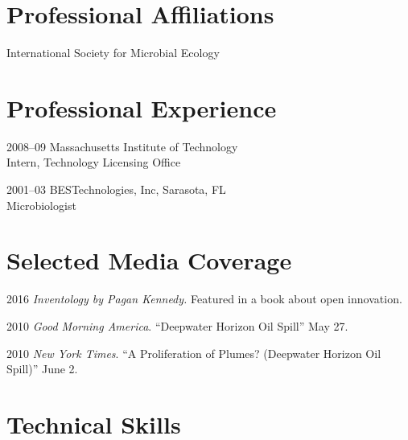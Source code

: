 \documentclass[12pt,letterpaper]{report}
\newcommand{\listitemspace}{0.15em}
\renewenvironment{itemize}
{\begin{list}{}{\setlength{\leftmargin}{0em}
            \setlength{\parskip}{0em}
            \setlength{\itemsep}{\listitemspace}
            \setlength{\parsep}{\listitemspace}}}
    {\end{list}}
\begin{document}
    \section*{Professional Affiliations}

    \begin{itemize}

        \item International Society for Microbial Ecology

    \end{itemize}



    \section*{Professional Experience}

    \begin{tablist}

        \item[2008--09] \tab Massachusetts Institute of Technology \\
        			    Intern, Technology Licensing Office
			    
	\item[2001--03] \tab BESTechnologies, Inc, Sarasota, FL \\
				Microbiologist	

    \end{tablist}



    \section*{Selected Media Coverage}

    \begin{tablist}
        \item[2016] \tab \textit{Inventology by Pagan Kennedy.} Featured in a book about open innovation.
        \item[2010] \tab \textit{Good Morning America}.  \enquote{Deepwater Horizon Oil Spill}  May 27.

        \item[2010] \tab \textit{New York Times}. \enquote{A Proliferation of Plumes? (Deepwater Horizon Oil Spill)}  June 2.
        


    \end{tablist}



    \section*{Technical Skills}
\end{document}
